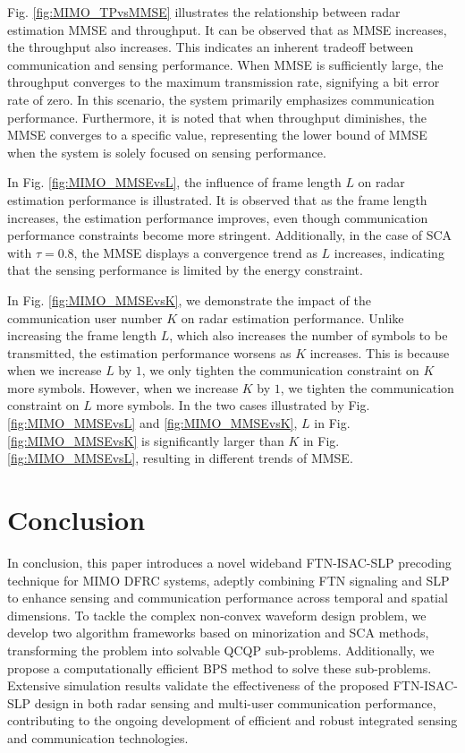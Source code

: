 \documentclass[lettersize,journal]{IEEEtran}
\begin{document}
Fig. \ref{fig:MIMO_TPvsMMSE} illustrates the relationship between radar estimation MMSE and throughput. It can be observed that as MMSE increases, the throughput also increases. This indicates an inherent tradeoff between communication and sensing performance. When MMSE is sufficiently large, the throughput converges to the maximum transmission rate, signifying a bit error rate of zero. In this scenario, the system primarily emphasizes communication performance. Furthermore, it is noted that when throughput diminishes, the MMSE converges to a specific value, representing the lower bound of MMSE when the system is solely focused on sensing performance.

In Fig. \ref{fig:MIMO_MMSEvsL}, the influence of frame length $L$ on radar estimation performance is illustrated. It is observed that as the frame length increases, the estimation performance improves, even though communication performance constraints become more stringent. Additionally, in the case of SCA with $\tau=0.8$, the MMSE displays a convergence trend as $L$ increases, indicating that the sensing performance is limited by the energy constraint.

In Fig. \ref{fig:MIMO_MMSEvsK}, we demonstrate the impact of the communication user number $K$ on radar estimation performance. Unlike increasing the frame length $L$, which also increases the number of symbols to be transmitted, the estimation performance worsens as $K$ increases. This is because when we increase $L$ by $1$, we only tighten the communication constraint on $K$ more symbols. However, when we increase $K$ by $1$, we tighten the communication constraint on $L$ more symbols. In the two cases illustrated by Fig. \ref{fig:MIMO_MMSEvsL} and \ref{fig:MIMO_MMSEvsK}, $L$ in Fig. \ref{fig:MIMO_MMSEvsK} is significantly larger than $K$ in Fig. \ref{fig:MIMO_MMSEvsL}, resulting in different trends of MMSE.


\section{Conclusion}
In conclusion, this paper introduces a novel wideband FTN-ISAC-SLP precoding technique for MIMO DFRC systems, adeptly combining FTN signaling and SLP to enhance sensing and communication performance across temporal and spatial dimensions. To tackle the complex non-convex waveform design problem, we develop two algorithm frameworks based on minorization and SCA methods, transforming the problem into solvable QCQP sub-problems. Additionally, we propose a computationally efficient BPS method to solve these sub-problems. Extensive simulation results validate the effectiveness of the proposed FTN-ISAC-SLP design in both radar sensing and multi-user communication performance, contributing to the ongoing development of efficient and robust integrated sensing and communication technologies.




\end{document}
